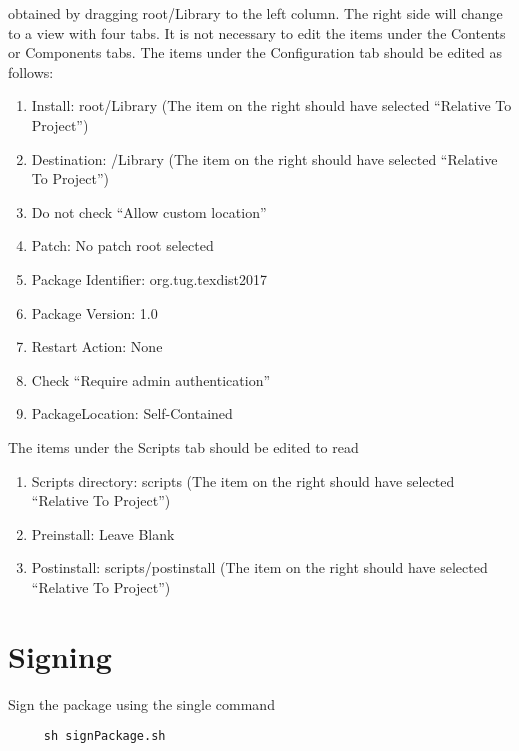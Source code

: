 \documentclass[11pt, oneside]{amsart}
\begin{document}
\begin{enumerate}
obtained by dragging root/Library to the left column. The right side will change to a view with four tabs.
 It is not necessary to edit the
items under the Contents or Components tabs. The items under the
Configuration tab should be edited as follows:
\begin{enumerate}
\item Install: root/Library (The item on the right should have selected ``Relative To Project'')
\item Destination: /Library (The item on the right should have selected ``Relative To Project'')
\item Do not check ``Allow custom location''
\item Patch: No patch root selected
\item Package Identifier: org.tug.texdist2017
\item Package Version: 1.0
\item Restart Action: None
\item Check ``Require admin authentication''
\item PackageLocation: Self-Contained
\end{enumerate}
The items under the Scripts tab should be edited to read
\begin{enumerate}
\item Scripts directory: scripts (The item on the right should have selected ``Relative To Project'')
\item Preinstall: Leave Blank
\item Postinstall: scripts/postinstall (The item on the right should have selected ``Relative To Project'')
\end{enumerate}

\end{enumerate}



\section{Signing}

Sign the package using the single command
\begin{verbatim}
     sh signPackage.sh
\end{verbatim}
\end{document}
